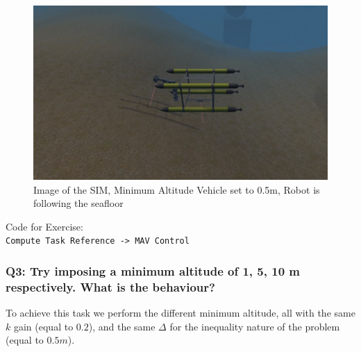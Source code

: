 \documentclass{article}
\begin{document}
\begin{figure}[t]
    \centering
    \includegraphics[scale=0.4]{122_MAV1m.png}
    \caption{Image of the SIM, Minimum Altitude Vehicle set to 0.5m, Robot is following the seafloor}
    \label{images_2_1}
\end{figure}

\colorbox{mygray}{\parbox{0.9\textwidth}{Code for Exercise: \\
\texttt{Compute Task Reference -> MAV Control}\\
}}

\subsubsection{Q3: Try imposing a minimum altitude of 1, 5, 10 m respectively. What is the behaviour?}
To achieve this task we perform the different minimum altitude, all with the same $k$ gain (equal to $0.2$), and the same $\Delta$ for the inequality nature of the problem (equal to $0.5 m$).
\end{document}

